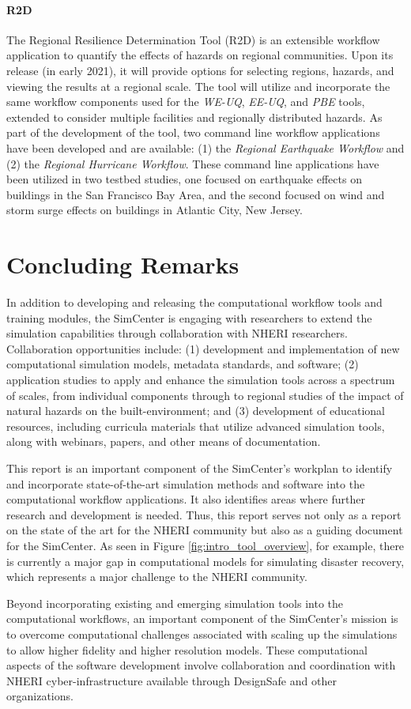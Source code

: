 \paragraph{R2D} The Regional Resilience Determination Tool (R2D) is an extensible workflow application to quantify the effects of hazards on regional communities. Upon its release (in early 2021), it will provide options for selecting regions, hazards, and viewing the results at a regional scale. The tool will utilize and incorporate the same workflow components used for the \emph{WE-UQ}, \emph{EE-UQ}, and \emph{PBE} tools, extended to consider multiple facilities and regionally distributed hazards. As part of the development of the tool, two command line workflow applications have been developed and are available: (1) the \emph{Regional Earthquake Workflow} and (2) the \emph{Regional Hurricane Workflow}.  These command line  applications have been utilized in two testbed studies, one focused on earthquake effects on buildings in the San Francisco Bay Area, and the second focused on wind and storm surge effects on buildings in Atlantic City, New Jersey.

\section{Concluding Remarks}

In addition to developing and releasing the computational workflow tools and training modules, the SimCenter is engaging with researchers to extend the simulation capabilities through collaboration with NHERI researchers. Collaboration opportunities include: (1) development and implementation of new computational simulation models, metadata standards, and software; (2) application studies to apply and enhance the simulation tools across a spectrum of scales, from individual components through to regional studies of the impact of natural hazards on the built-environment; and (3) development of educational resources, including curricula materials that utilize advanced simulation tools, along with webinars, papers, and other means of documentation. 

This report is an important component of the SimCenter’s workplan to identify and incorporate state-of-the-art simulation methods and software into the computational workflow applications. It also identifies areas where further research and development is needed.  Thus, this report serves not only as a  report on the state of the art for the NHERI community but also as a guiding document for the SimCenter.  As seen in Figure \ref{fig:intro_tool_overview}, for example, there is currently a major gap in computational models for simulating disaster recovery, which represents a major challenge to the NHERI community. 

Beyond incorporating existing and emerging simulation tools into the computational workflows, an important component of the SimCenter’s mission is to overcome computational challenges associated with scaling up the simulations to allow higher fidelity and higher resolution models.  These computational aspects of the software development involve collaboration and coordination with NHERI cyber-infrastructure available through DesignSafe and other organizations. 